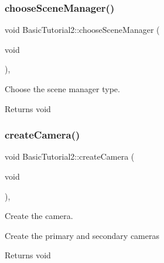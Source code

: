 \subsubsection{\texorpdfstring{choose\+Scene\+Manager()}{chooseSceneManager()}}
{\footnotesize\ttfamily void Basic\+Tutorial2\+::choose\+Scene\+Manager (\begin{DoxyParamCaption}\item[{void}]{ }\end{DoxyParamCaption})\hspace{0.3cm}{\ttfamily [protected]}, {\ttfamily [virtual]}}



Choose the scene manager type. 

\begin{DoxyReturn}{Returns}
void 
\end{DoxyReturn}
\hypertarget{class_basic_tutorial2_affb4d35ed7a64245dec901ae6dbf3497}{}\label{class_basic_tutorial2_affb4d35ed7a64245dec901ae6dbf3497} 
\subsubsection{\texorpdfstring{create\+Camera()}{createCamera()}}
{\footnotesize\ttfamily void Basic\+Tutorial2\+::create\+Camera (\begin{DoxyParamCaption}\item[{void}]{ }\end{DoxyParamCaption})\hspace{0.3cm}{\ttfamily [protected]}, {\ttfamily [virtual]}}



Create the camera. 

Create the primary and secondary cameras

\begin{DoxyReturn}{Returns}
void 
\end{DoxyReturn}
\hypertarget{class_basic_tutorial2_a633e601ce8a0ac132be83c93ebadb04b}{}\label{class_basic_tutorial2_a633e601ce8a0ac132be83c93ebadb04b} 
